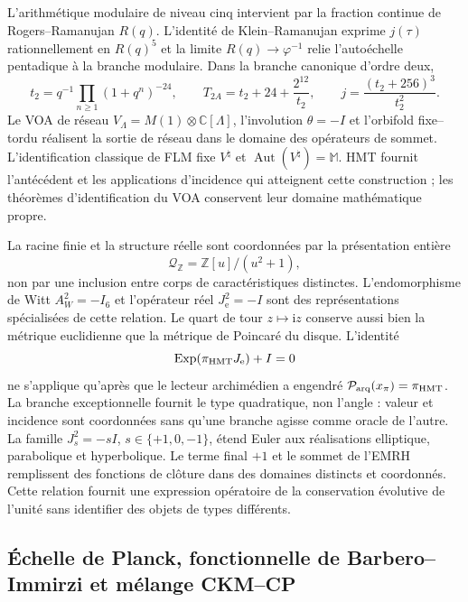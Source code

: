 L'arithmétique modulaire de niveau cinq intervient par la fraction continue de
Rogers--Ramanujan \(R(q)\). L'identité de Klein--Ramanujan exprime
\(j(\tau)\) rationnellement en \(R(q)^5\) et la limite
\(R(q)\to\varphi^{-1}\) relie l'autoéchelle pentadique à la branche modulaire.
Dans la branche canonique d'ordre deux,
\[
 t_2=q^{-1}\prod_{n\ge1}(1+q^n)^{-24},\qquad
 T_{2A}=t_2+24+\frac{2^{12}}{t_2},
 \qquad j=\frac{(t_2+256)^3}{t_2^2}.
\]
Le VOA de réseau
\(V_\Lambda=M(1)\otimes\mathbb C[\Lambda]\), l'involution
\(\theta=-I\) et l'orbifold fixe--tordu réalisent la sortie de réseau dans le
domaine des opérateurs de sommet. L'identification classique de FLM fixe
\(V^\natural\) et \(\operatorname{Aut}(V^\natural)=\mathbb M\). HMT fournit
l'antécédent et les applications d'incidence qui atteignent cette construction ; les
théorèmes d'identification du VOA conservent leur domaine mathématique propre.

La racine finie et la structure réelle sont coordonnées par la présentation
entière
\[
 \mathcal Q_{\mathbb Z}=\mathbb Z[u]/(u^2+1),
\]
non par une inclusion entre corps de caractéristiques distinctes.
L'endomorphisme de Witt \(A_W^2=-I_6\) et l'opérateur réel
\(J_{\mathrm e}^2=-I\) sont des représentations spécialisées de cette relation.
Le quart de tour \(z\mapsto\mathrm iz\) conserve aussi bien la métrique euclidienne
que la métrique de Poincaré du disque. L'identité
\[
 \operatorname{Exp}(\pi_{\rm HMT}J_{\mathrm e})+I=0
\]
ne s'applique qu'après que le lecteur archimédien a engendré
\(\mathcal P_{\rm arq}(x_\pi)=\pi_{\rm HMT}\). La branche exceptionnelle fournit
le type quadratique, non l'angle : valeur et incidence sont coordonnées sans
qu'une branche agisse comme oracle de l'autre.
La famille \(J_s^2=-sI\),
\(s\in\{+1,0,-1\}\), étend Euler aux réalisations elliptique,
parabolique et hyperbolique. Le terme final \(+1\) et le sommet de l'EMRH
remplissent des fonctions de clôture dans des domaines distincts et coordonnés. Cette
relation fournit une expression opératoire de la conservation évolutive de
l'unité sans identifier des objets de types différents.

\subsection*{Échelle de Planck, fonctionnelle de Barbero--Immirzi et mélange CKM--CP}

